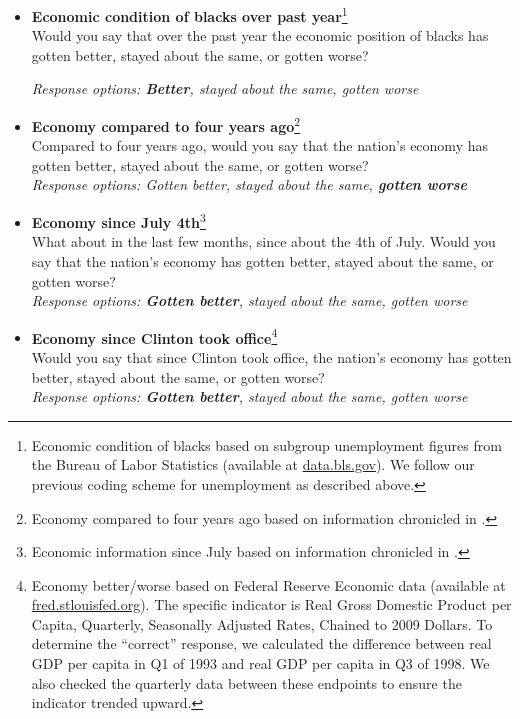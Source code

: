 \documentclass[12pt, letterpaper]{article}
\begin{document}
\normalsize
\begin{itemize}
\item \textbf{Economic condition of blacks over past year}\footnote{Economic condition of blacks based on subgroup unemployment figures from the Bureau of Labor Statistics (available at \url{data.bls.gov}). We follow our previous coding scheme for unemployment as described above.}   \\
Would you say that over the past year the economic position of blacks has gotten better, stayed about the same, or gotten worse?

\textit{Response options: \textbf{Better}, stayed about the same, gotten worse} 
\end{itemize}

\vspace{.1in}
\large {}
\normalsize
\begin{itemize}
\item \textbf{Economy compared to four years ago}\footnote{Economy compared to four years ago based on information chronicled in \citet{hershey_1993}.}   \\
Compared to four years ago, would you say that the nation's economy has gotten better, stayed about the same, or gotten worse?        \\
\textit{Response options: Gotten better, stayed about the same, \textbf{gotten worse}} 
\end{itemize}

\normalsize
\begin{itemize}
\item \textbf{Economy since July 4th}\footnote{Economic information since July based on information chronicled in \citet{apple_1992}.}   \\
What about in the last few months, since about the 4th of July. Would you say that the nation's economy has gotten better, stayed about the same, or gotten worse?    \\
\textit{Response options: \textbf{Gotten better}, stayed about the same, gotten worse} 
\end{itemize}
\vspace{.1in}

\large {}
\normalsize
\begin{itemize}
\item \textbf{Economy since Clinton took office}\footnote{Economy better/worse based on Federal Reserve Economic data (available at \url{fred.stlouisfed.org}). The specific indicator is Real Gross Domestic Product per Capita, Quarterly, Seasonally Adjusted Rates, Chained to 2009 Dollars. To determine the ``correct'' response, we calculated the difference between real GDP per capita in Q1 of 1993 and real GDP per capita in Q3 of 1998. We also checked the quarterly data between these endpoints to ensure the indicator trended upward.} \\
Would you say that since Clinton took office, the nation's economy has gotten better, stayed about the same, or gotten worse?           \\
\textit{Response options: \textbf{Gotten better}, stayed about the same, gotten worse} \\
\end{itemize}
\end{document}
